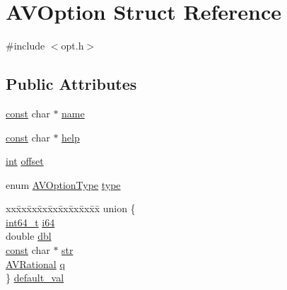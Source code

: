 \hypertarget{struct_a_v_option}{}\section{A\+V\+Option Struct Reference}
\label{struct_a_v_option}


{\ttfamily \#include $<$opt.\+h$>$}

\subsection*{Public Attributes}
\begin{DoxyCompactItemize}
\item 
\hyperlink{getopt1_8c_a2c212835823e3c54a8ab6d95c652660e}{const} char $\ast$ \hyperlink{struct_a_v_option_a87e81c6e58d6a94d97a98ad15a4e507c}{name}
\item 
\hyperlink{getopt1_8c_a2c212835823e3c54a8ab6d95c652660e}{const} char $\ast$ \hyperlink{struct_a_v_option_a6c72d22b8c599e89abba088b85dfcd8a}{help}
\item 
\hyperlink{xmltok_8h_a5a0d4a5641ce434f1d23533f2b2e6653}{int} \hyperlink{struct_a_v_option_a0ab0d209c04b72cfd72808c9e9e46a46}{offset}
\item 
enum \hyperlink{group__avoptions_gabd75aa30eb8ad6387672df9a1fa79444}{A\+V\+Option\+Type} \hyperlink{struct_a_v_option_af50f9be082b4b1cf0d76b1e24face3bc}{type}
\item 
\begin{tabbing}
xx\=xx\=xx\=xx\=xx\=xx\=xx\=xx\=xx\=\kill
union \{\\
\>\hyperlink{lib-src_2ffmpeg_2win32_2stdint_8h_a67a9885ef4908cb72ce26d75b694386c}{int64\_t} \hyperlink{struct_a_v_option_a9ee4ba4426ba1ff7e2f8030d2c49ba35}{i64}\\
\>double \hyperlink{struct_a_v_option_afd9a2f8e983c9ee8de643621022064f0}{dbl}\\
\>\hyperlink{getopt1_8c_a2c212835823e3c54a8ab6d95c652660e}{const} char $\ast$ \hyperlink{struct_a_v_option_a3edf01c0c79e387474ef38a3d9e6f79c}{str}\\
\>\hyperlink{struct_a_v_rational}{AVRational} \hyperlink{struct_a_v_option_a3dc71ba8963767a30821b5b2bfc7e79d}{q}\\
\} \hyperlink{struct_a_v_option_a4e7968bd94d3e773e5fe145f919ecd9e}{default\_val}\\


\end{tabbing}
\end{DoxyCompactItemize}

